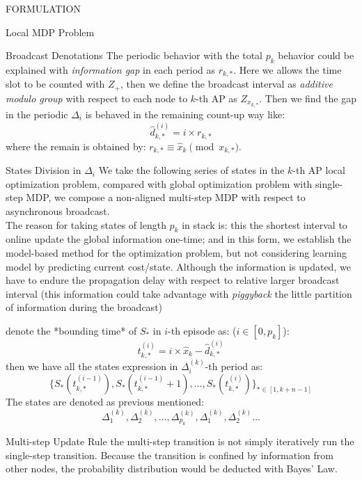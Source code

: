 \documentclass[10pt, conference, letterpaper]{IEEEtran}
\begin{document}
\begin{section}{FORMULATION}
\begin{subsection}{Local MDP Problem}
\begin{subsubsection}{Broadcast Denotations}
                The periodic behavior with the total $p_k$ behavior could be explained with \textit{information gap} in each period as $r_{k,*}$. Here we allows the time slot to be counted with $Z_+$, then we define the broadcast interval as \textit{additive modulo group} with respect to each node to $k$-th AP as $Z_{x_{k,*}}$. Then we find the gap in the periodic $\Delta_i$ is behaved in the remaining count-up way like:
                $$
                \hat{d}_{k,*}^{(i)} = i \times r_{k,*}
                $$
                where the remain is obtained by: $r_{k,*} \equiv \hat{x}_k \pmod{x_{k,*}}$.
            \end{subsubsection}

            \begin{subsubsection}{States Division in $\Delta_i$}
                We take the following series of states in the $k$-th AP local optimization problem, compared with global optimization problem with single-step MDP, we compose a non-aligned multi-step MDP with respect to asynchronous broadcast.
                \\
                The reason for taking states of length $p_k$ in stack is: this the shortest interval to online update the global information one-time; and in this form, we establish the model-based method for the optimization problem, but not considering learning model by predicting current cost/state. Although the information is updated, we have to endure the propagation delay with respect to relative larger broadcast interval (this information could take advantage with \emph{piggyback} the little partition of information during the broadcast)

                denote the *bounding time* of $S_*$ in $i$-th episode as: ($i \in [0, p_k]$):
                $$
                t^{(i)}_{k,*} = i \times \hat{x}_k - \hat{d}^{(i)}_{k,*}
                $$
                then we have all the states expression in $\Delta^{(k)}_i$-th period as:
                $$
                \{ S_*(t^{(i-1)}_{k,*}), S_*(t^{(i-1)}_{k,*}+1), \dots, S_*(t^{(i)}_{k,*}) \}_{* \in [1,k+n-1]}
                $$
                The states are denoted as previous mentioned:
                $$
                \Delta^{(k)}_{1}, \Delta^{(k)}_{2}, \dots, \Delta^{(k)}_{p_k}, \Delta^{(k)}_{1}, \Delta^{(k)}_{2}\dots
                $$
            \end{subsubsection}

            \begin{subsubsection}{Multi-step Update Rule}
                the multi-step transition is not simply iteratively run the single-step transition. Because the transition is confined by information from other nodes, the probability distribution would be deducted with Bayes' Law.


\end{subsubsection}
\end{subsection}
\end{section}
\end{document}
